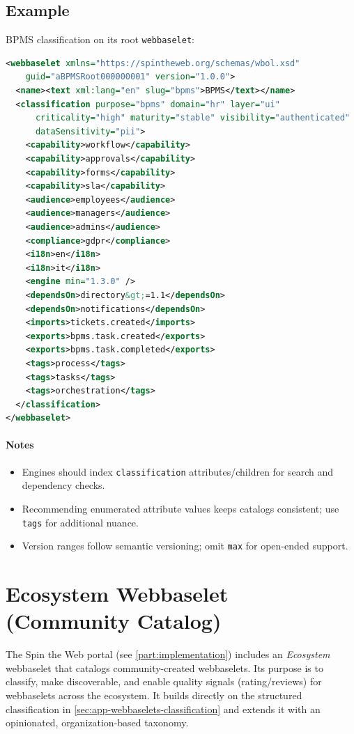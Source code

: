 \subsection{Example}
BPMS classification on its root \texttt{webbaselet}:
\begin{lstlisting}[language=XML,caption={Webbaselet with classification}]
<webbaselet xmlns="https://spintheweb.org/schemas/wbol.xsd"
    guid="aBPMSRoot000000001" version="1.0.0">
  <name><text xml:lang="en" slug="bpms">BPMS</text></name>
  <classification purpose="bpms" domain="hr" layer="ui"
      criticality="high" maturity="stable" visibility="authenticated"
      dataSensitivity="pii">
    <capability>workflow</capability>
    <capability>approvals</capability>
    <capability>forms</capability>
    <capability>sla</capability>
    <audience>employees</audience>
    <audience>managers</audience>
    <audience>admins</audience>
    <compliance>gdpr</compliance>
    <i18n>en</i18n>
    <i18n>it</i18n>
    <engine min="1.3.0" />
    <dependsOn>directory&gt;=1.1</dependsOn>
    <dependsOn>notifications</dependsOn>
    <imports>tickets.created</imports>
    <exports>bpms.task.created</exports>
    <exports>bpms.task.completed</exports>
    <tags>process</tags>
    <tags>tasks</tags>
    <tags>orchestration</tags>
  </classification>
</webbaselet>
\end{lstlisting}

\paragraph{Notes}
\begin{itemize}
  \item Engines should index \texttt{classification} attributes/children for search and dependency checks.
  \item Recommending enumerated attribute values keeps catalogs consistent; use \texttt{tags} for additional nuance.
  \item Version ranges follow semantic versioning; omit \texttt{max} for open-ended support.
\end{itemize}

\section{Ecosystem Webbaselet (Community Catalog)}
\label{sec:app-ecosystem}

The Spin the Web portal (see \cref{part:implementation}) includes an \emph{Ecosystem} webbaselet that catalogs community-created webbaselets. Its purpose is to classify, make discoverable, and enable quality signals (rating/reviews) for webbaselets across the ecosystem. It builds directly on the structured classification in \cref{sec:app-webbaselets-classification} and extends it with an opinionated, organization-based taxonomy.

